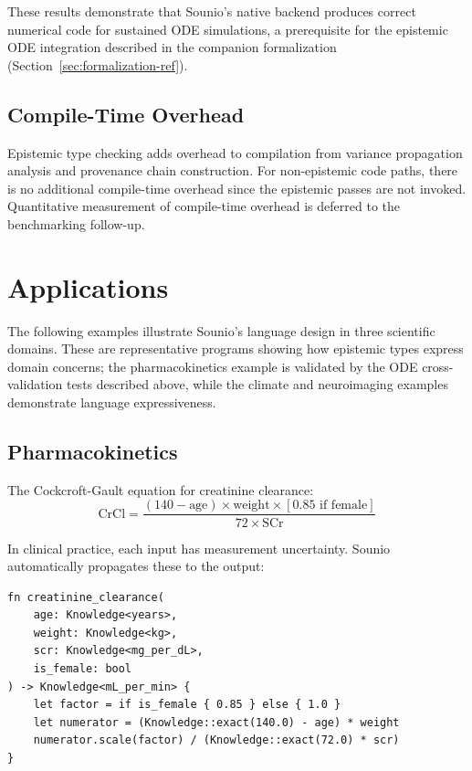 \documentclass[11pt,a4paper]{article}
\begin{document}
These results demonstrate that Sounio's native backend produces correct
numerical code for sustained ODE simulations, a prerequisite for the
epistemic ODE integration described in the companion formalization
(Section~\ref{sec:formalization-ref}).

\subsection{Compile-Time Overhead}

Epistemic type checking adds overhead to compilation from variance
propagation analysis and provenance chain construction. For non-epistemic
code paths, there is no additional compile-time overhead since the
epistemic passes are not invoked. Quantitative measurement of compile-time
overhead is deferred to the benchmarking follow-up.

\section{Applications}
\label{sec:applications}

The following examples illustrate Sounio's language design in three
scientific domains. These are representative programs showing how
epistemic types express domain concerns; the pharmacokinetics example
is validated by the ODE cross-validation tests described above, while
the climate and neuroimaging examples demonstrate language expressiveness.

\subsection{Pharmacokinetics}

The Cockcroft-Gault equation for creatinine clearance:
\[
  \text{CrCl} = \frac{(140 - \text{age}) \times \text{weight} \times [0.85 \text{ if female}]}{72 \times \text{SCr}}
\]

In clinical practice, each input has measurement uncertainty. Sounio
automatically propagates these to the output:

\begin{lstlisting}[caption={GUM-compliant drug dosing}]
fn creatinine_clearance(
    age: Knowledge<years>,
    weight: Knowledge<kg>,
    scr: Knowledge<mg_per_dL>,
    is_female: bool
) -> Knowledge<mL_per_min> {
    let factor = if is_female { 0.85 } else { 1.0 }
    let numerator = (Knowledge::exact(140.0) - age) * weight
    numerator.scale(factor) / (Knowledge::exact(72.0) * scr)
}
\end{lstlisting}
\end{document}

